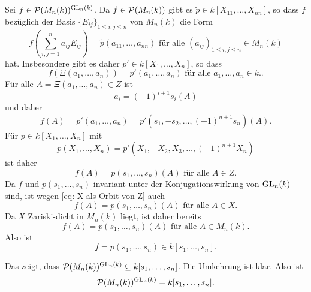 \documentclass[a4paper,10pt]{article}
\begin{document}
\subsection{}
Sei $f \in \mathcal{P}(M_n(k))^{\operatorname{GL}_n(k)}$. Da $f \in \mathcal{P}(M_n(k))$ gibt es $\tilde{p} \in k[X_{11}, \ldots, X_{nn}]$, so dass $f$ bezüglich der Basis $\{E_{ij}\}_{1 \leq i,j \leq n}$ von $M_n(k)$ die Form
\[
 f\left( \sum_{i,j=1}^n a_{ij} E_{ij} \right) = \tilde{p}(a_{11}, \ldots, a_{nn}) \text{ für alle } (a_{ij})_{1 \leq i,j \leq n} \in M_n(k)
\]
hat. Insbesondere gibt es daher $p' \in k[X_1, \ldots, X_n]$, so dass
\[
 f\left( \Xi(a_1, \ldots, a_n) \right) = p'(a_1, \ldots, a_n) \text{ für alle } a_1, \ldots, a_n \in k..
\]
Für alle $A = \Xi(a_1, \ldots, a_n) \in Z$ ist
\[
 a_i = (-1)^{i+1} s_i(A)
\]
und daher
\[
 f(A) = p'(a_1, \ldots, a_n) = p'\left(s_1, -s_2, \ldots, (-1)^{n+1} s_n\right)(A).
\]
Für $p \in k[X_1, \ldots, X_n]$ mit
\[
 p(X_1, \ldots, X_n) = p'(X_1, -X_2, X_3, \ldots, (-1)^{n+1} X_n)
\]
ist daher
\[
 f(A) = p(s_1, \ldots, s_n)(A) \text{ für alle } A \in Z.
\]
Da $f$ und $p(s_1, \ldots, s_n)$ invariant unter der Konjugationswirkung von $\operatorname{GL}_n(k)$ sind, ist wegen \eqref{eq: X als Orbit von Z} auch
\[
 f(A) = p(s_1, \ldots, s_n)(A) \text{ für alle } A \in X.
\]
Da $X$ Zariski-dicht in $M_n(k)$ liegt, ist daher bereits
\[
 f(A) = p(s_1, \ldots, s_n)(A) \text{ für alle } A \in M_n(k).
\]
Also ist
\[
 f = p(s_1, \ldots, s_n) \in k[s_1, \ldots, s_n].
\]

Das zeigt, dass $\mathcal{P}(M_n(k))^{\operatorname{GL}_n(k)} \subseteq k[s_1, \ldots, s_n]$. Die Umkehrung ist klar. Also ist
\[
 \mathcal{P}(M_n(k))^{\operatorname{GL}_n(k)} = k[s_1, \ldots, s_n].
\]
\end{document}
